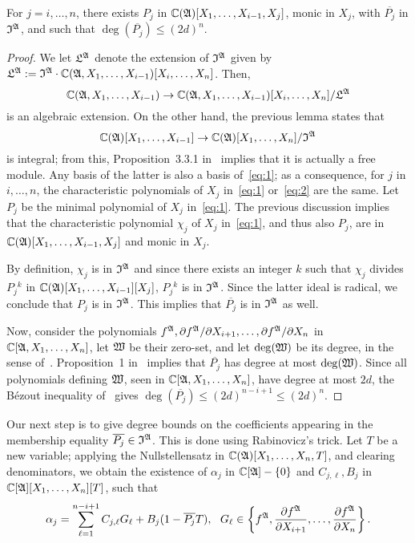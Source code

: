 \documentclass[sigconf]{acmart}
\def\pjb{\overline{P_{j}}}
\def\C{\mathbb{C}}
\def\pa{\partial}
\def\I{\frak{I}}
\def\A{\frak{A}}
\begin{document}
\begin{lemma} 
  For $j=i,\dots,n$, there exists $P_j$ in $
  \C(\A)[X_1,\dots,X_{i-1},X_j]$, monic in $X_j$, with $\pjb$ in
  $\I^\A$, and such that $\deg(\pjb)\leq (2d)^{n}.$
\end{lemma} 
\begin{proof}
  We let $\frak L^\A$ denote the extension of $\I^\A$ given by $\frak
  L^\A:=\I^\A\cdot \C(\frak A, X_1,\dots,X_{i-1})[X_i,\dots,X_n]$. Then,
  \begin{equation}\label{eq:1}
    \C(\frak A, X_1,\dots,X_{i-1}) \to \C(\frak A,
    X_1,\dots,X_{i-1})[X_i,\dots,X_n]/\frak L^\A
  \end{equation}
  is an algebraic extension. On the other hand, 
  the previous lemma states that 
  \begin{equation}\label{eq:2}
    \C(\A)[X_1,\dots,X_{i-1}]\rightarrow
    \C(\A)[X_1,\dots,X_n]/\I^{\A}  
  \end{equation}
  is integral; from this, Proposition~3.3.1 in~\cite{GiHeSa93} implies
  that it is actually a free module. Any basis of the latter is also a
  basis of~\eqref{eq:1}; as a consequence, for $j$ in $i,\dots,n$, the
  characteristic polynomials of $X_j$ in~\eqref{eq:1} or~\eqref{eq:2}
  are the same. Let $P_j$ be the minimal polynomial of $X_j$
  in~\eqref{eq:1}. The previous discussion implies that the
  characteristic polynomial $\chi_j$ of $X_j$ in~\eqref{eq:1}, and
  thus also $P_j$, are in $\C(\A)[X_1,\dots,X_{i-1},X_j]$ and monic in
  $X_j$.

  By definition, $\chi_{j}$ is in $\frak I^\A$ and since there exists
  an integer $k$ such that $\chi_j$ divides $P_j{}^k$ in
  $\C(\A)[X_1,\dots,X_{i-1}][X_j]$, $P_j{}^k$ is in $\frak
  I^\A$. Since the latter ideal is radical, we conclude that $P_{j}$
  is in $\frak I^\A$. This implies that $\pjb$ is in $\frak I^\A$ as
  well.

  Now, consider the polynomials $f^\A, {\pa f^\A}/{\pa
    X_{i+1}}, \dots, {\pa f^\A}/{\pa X_n}$ in $\C[\A,X_1,\dots,X_n]$,
  let $\frak W$ be their zero-set, and let $\deg(\frak W)$ be its
  degree, in the sense of~\cite{H}. Proposition~1 in~\cite{CGR}
  implies that $\pjb$ has degree at most $\deg(\frak W)$. Since all
  polynomials defining $\frak W$, seen in $\C[\A,X_1,\dots,X_n]$, have
  degree at most $2d$, the B\'ezout inequality of~\cite{H} gives
  $\deg(\pjb) \le (2d)^{n-i+1} \le (2d)^n$.
\end{proof}

Our next step is to give degree bounds on the coefficients appearing
in the membership equality $\pjb \in\I^\A$. This is done using
Rabinovicz's trick. Let $T$ be a new variable; applying the
Nullstellensatz in $\C(\A)[X_1,\dots,X_n,T]$, and clearing
denominators, we obtain the existence of $\alpha_j$ in
$\C[\A]-\{0\}$ and $ C_{j,\ell},B_j$ in
$\C[\A][X_1,\dots,X_n][T]$, such that
\begin{align}\label{eq:nullst}
\alpha_j = \sum_{\ell=1}^{n-i+1} C_{j,\ell} G_\ell + B_j (1-\pjb T),\ \  G_\ell \in 
\left\{ 
f^\A,\frac{\partial f^\A}{\partial X_{i+1}},\hdots,\frac{\partial f^\A}{\partial X_n}
\right\}.
\end{align}
\end{document}
